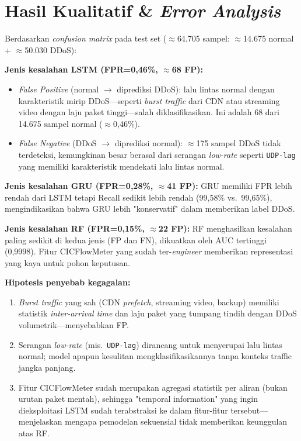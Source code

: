 \documentclass[11pt,a4paper,oneside]{report}
\begin{document}
\section{Hasil Kualitatif \& \textit{Error Analysis}}

Berdasarkan \textit{confusion matrix} pada test set ($\approx$64.705 sampel: $\approx$14.675 normal + $\approx$50.030 DDoS):

\textbf{Jenis kesalahan LSTM (FPR=0,46\%, $\approx$68 FP):}
\begin{itemize}[leftmargin=*]
    \item \textit{False Positive} (normal $\to$ diprediksi DDoS): lalu lintas normal dengan karakteristik mirip DDoS---seperti \textit{burst traffic} dari CDN atau streaming video dengan laju paket tinggi---salah diklasifikasikan. Ini adalah 68 dari 14.675 sampel normal ($\approx$0,46\%).
    \item \textit{False Negative} (DDoS $\to$ diprediksi normal): $\approx$175 sampel DDoS tidak terdeteksi, kemungkinan besar berasal dari serangan \textit{low-rate} seperti \texttt{UDP-lag} yang memiliki karakteristik mendekati lalu lintas normal.
\end{itemize}

\textbf{Jenis kesalahan GRU (FPR=0,28\%, $\approx$41 FP):} GRU memiliki FPR lebih rendah dari LSTM tetapi Recall sedikit lebih rendah (99,58\% vs.\ 99,65\%), mengindikasikan bahwa GRU lebih "konservatif" dalam memberikan label DDoS.

\textbf{Jenis kesalahan RF (FPR=0,15\%, $\approx$22 FP):} RF menghasilkan kesalahan paling sedikit di kedua jenis (FP dan FN), dikuatkan oleh AUC tertinggi (0,9998). Fitur CICFlowMeter yang sudah ter-\textit{engineer} memberikan representasi yang kaya untuk pohon keputusan.

\textbf{Hipotesis penyebab kegagalan:}
\begin{enumerate}[leftmargin=*]
    \item \textit{Burst traffic} yang sah (CDN \textit{prefetch}, streaming video, backup) memiliki statistik \textit{inter-arrival time} dan laju paket yang tumpang tindih dengan DDoS volumetrik---menyebabkan FP.
    \item Serangan \textit{low-rate} (mis.\ \texttt{UDP-lag}) dirancang untuk menyerupai lalu lintas normal; model apapun kesulitan mengklasifikasikannya tanpa konteks traffic jangka panjang.
    \item Fitur CICFlowMeter sudah merupakan agregasi statistik per aliran (bukan urutan paket mentah), sehingga "temporal information" yang ingin dieksploitasi LSTM sudah terabstraksi ke dalam fitur-fitur tersebut---menjelaskan mengapa pemodelan sekuensial tidak memberikan keunggulan atas RF.
\end{enumerate}
\end{document}
